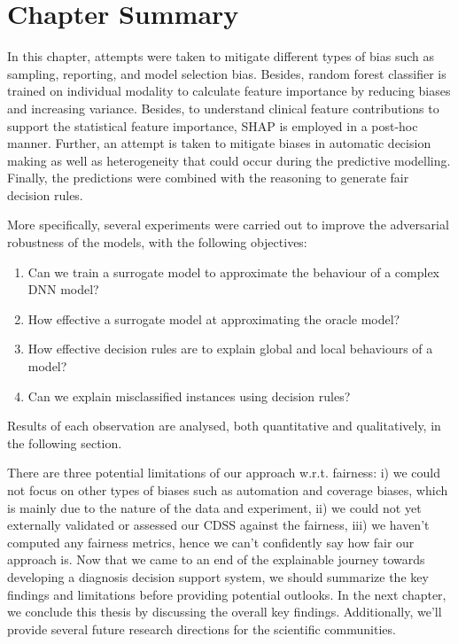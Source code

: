 \section{Chapter Summary}\label{chapter_9:conclusion}
In this chapter, attempts were taken to mitigate different types of bias such as sampling, reporting, and model selection bias. Besides, random forest classifier is  trained on individual modality to calculate feature importance by reducing biases and increasing variance. Besides, to understand clinical feature contributions to support the statistical feature importance, SHAP is employed in a post-hoc manner. Further, an attempt is taken to mitigate biases in automatic decision making as well as heterogeneity that could occur during the predictive modelling. Finally, the predictions were combined with the reasoning to generate fair decision rules. 

\hspace*{3.5mm} More specifically, several experiments were carried out to improve the adversarial robustness of the models, with the following objectives:

\begin{enumerate}[noitemsep]
    \item Can we train a surrogate model to approximate the behaviour of a complex DNN model? 
    \item How effective a surrogate model at approximating the oracle model?  
    \item How effective decision rules are to explain global and local behaviours of a model?   
    \item Can we explain misclassified instances using decision rules? 
\end{enumerate}

\hspace*{3.5mm} Results of each observation are analysed, both quantitative and qualitatively, in the following section.

\hspace*{3.5mm} There are three potential limitations of our approach w.r.t. fairness: i) we could not focus on other types of biases such as automation and coverage biases, which is mainly due to the nature of the data and experiment, ii) we could not yet externally validated or assessed our CDSS against the fairness, iii) we haven't computed any fairness metrics, hence we can't confidently say how fair our approach is. Now that we came to an end of the explainable journey towards developing a diagnosis decision support system, we should summarize the key findings and limitations before providing potential outlooks. In the next chapter, we conclude this thesis by discussing the overall key findings. Additionally, we'll provide several future research directions for the scientific communities. 



